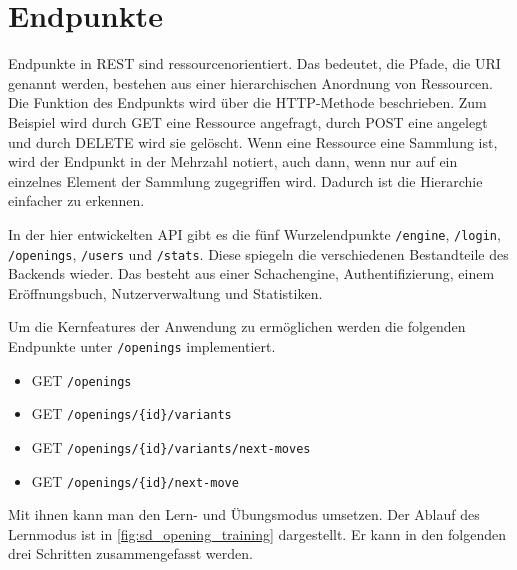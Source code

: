 \section{Endpunkte}
Endpunkte in \ac{REST} sind ressourcenorientiert. Das bedeutet, die Pfade, die \ac{URI} genannt werden, bestehen aus einer hierarchischen Anordnung von Ressourcen. Die Funktion des Endpunkts wird über die HTTP-Methode beschrieben. Zum Beispiel wird durch GET eine Ressource angefragt, durch POST eine angelegt und durch DELETE wird sie gelöscht. Wenn eine Ressource eine Sammlung ist, wird der Endpunkt in der Mehrzahl notiert, auch dann, wenn nur auf ein einzelnes Element der Sammlung zugegriffen wird. Dadurch ist die Hierarchie einfacher zu erkennen. 

In der hier entwickelten API gibt es die fünf Wurzelendpunkte \lstinline{/engine}, \lstinline{/login}, \lstinline{/openings}, \lstinline{/users} und \lstinline{/stats}. Diese spiegeln die verschiedenen Bestandteile des Backends wieder. Das besteht aus einer Schachengine, Authentifizierung, einem Eröffnungsbuch, Nutzerverwaltung und Statistiken.

Um die Kernfeatures der Anwendung zu ermöglichen werden die folgenden Endpunkte unter \lstinline{/openings} implementiert.

\begin{itemize}
    \item GET \verb|/openings|
    \item GET \verb|/openings/{id}/variants|
    \item GET \verb|/openings/{id}/variants/next-moves|
    \item GET \verb|/openings/{id}/next-move|
\end{itemize}

Mit ihnen kann man den Lern- und Übungsmodus umsetzen. Der Ablauf des Lernmodus ist in \autoref{fig:sd_opening_training} dargestellt. Er kann in den folgenden drei Schritten zusammengefasst werden.

